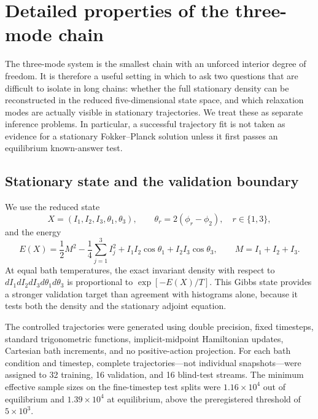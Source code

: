 \section{Detailed properties of the three-mode chain}
\label{sec:short-chain}

The three-mode system is the smallest chain with an unforced interior degree
of freedom.  It is therefore a useful setting in which to ask two questions
that are difficult to isolate in long chains: whether the full stationary
density can be reconstructed in the reduced five-dimensional state space, and
which relaxation modes are actually visible in stationary trajectories.  We
treat these as separate inference problems.  In particular, a successful
trajectory fit is not taken as evidence for a stationary Fokker--Planck
solution unless it first passes an equilibrium known-answer test.

\subsection{Stationary state and the validation boundary}
\label{sec:short-chain-density}

We use the reduced state
\begin{equation}
 X=(I_1,I_2,I_3,\theta_1,\theta_3),
 \qquad \theta_r=2(\phi_r-\phi_2),\quad r\in\{1,3\},
\end{equation}
and the energy
\begin{equation}
 E(X)=\frac12 M^2-\frac14\sum_{j=1}^3 I_j^2
      +I_1I_2\cos\theta_1+I_2I_3\cos\theta_3,
 \qquad M=I_1+I_2+I_3.
\end{equation}
At equal bath temperatures, the exact invariant density with respect to
$dI_1dI_2dI_3d\theta_1d\theta_3$ is proportional to $\exp[-E(X)/T]$.
This Gibbs state provides a stronger validation target than agreement with
histograms alone, because it tests both the density and the stationary adjoint
equation.

The controlled trajectories were generated using double precision, fixed
timesteps, standard trigonometric functions, implicit-midpoint Hamiltonian
updates, Cartesian bath increments, and no positive-action projection.  For
each bath condition and timestep, complete trajectories---not individual
snapshots---were assigned to 32 training, 16 validation, and 16 blind-test
streams.  The minimum effective sample sizes on the fine-timestep test splits
were $1.16\times10^4$ out of equilibrium and $1.39\times10^4$ at equilibrium,
above the preregistered threshold of $5\times10^3$.

